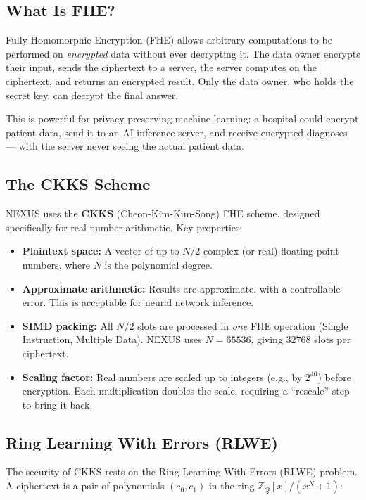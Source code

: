 \documentclass[11pt,letterpaper]{article}
\begin{document}
\subsection{What Is FHE?}

Fully Homomorphic Encryption (FHE) allows arbitrary computations to be performed on
\emph{encrypted} data without ever decrypting it. The data owner encrypts their input, sends
the ciphertext to a server, the server computes on the ciphertext, and returns an encrypted
result. Only the data owner, who holds the secret key, can decrypt the final answer.

This is powerful for privacy-preserving machine learning: a hospital could encrypt patient
data, send it to an AI inference server, and receive encrypted diagnoses --- with the server
never seeing the actual patient data.

\subsection{The CKKS Scheme}

NEXUS uses the \textbf{CKKS} (Cheon-Kim-Kim-Song) FHE scheme, designed specifically for
real-number arithmetic. Key properties:

\begin{itemize}
  \item \textbf{Plaintext space:} A vector of up to $N/2$ complex (or real) floating-point numbers, where $N$ is the polynomial degree.
  \item \textbf{Approximate arithmetic:} Results are approximate, with a controllable error. This is acceptable for neural network inference.
  \item \textbf{SIMD packing:} All $N/2$ slots are processed in \emph{one} FHE operation (Single Instruction, Multiple Data). NEXUS uses $N = 65536$, giving $32768$ slots per ciphertext.
  \item \textbf{Scaling factor:} Real numbers are scaled up to integers (e.g., by $2^{40}$) before encryption. Each multiplication doubles the scale, requiring a ``rescale'' step to bring it back.
\end{itemize}

\subsection{Ring Learning With Errors (RLWE)}

The security of CKKS rests on the Ring Learning With Errors (RLWE) problem. A ciphertext is
a pair of polynomials $(c_0, c_1)$ in the ring $\mathbb{Z}_Q[x]/(x^N + 1)$:
\end{document}
